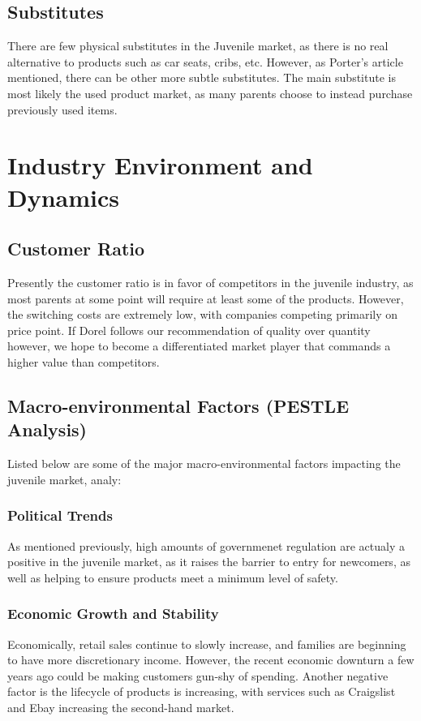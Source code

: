{\subsection{Substitutes}
There are few physical substitutes in the Juvenile market, as there is no real alternative to products such as car seats, cribs, etc.  However, as Porter's article mentioned, there can be other more subtle substitutes.  The main substitute is most likely the used product market, as many parents choose to instead purchase previously used items.

\section{Industry Environment and Dynamics}
\subsection{Customer Ratio}
Presently the customer ratio is in favor of competitors in the juvenile industry, as most parents at some point will require at least some of the products.  However, the switching costs are extremely low, with companies competing primarily on price point.  If Dorel follows our recommendation of quality over quantity however, we hope to become a differentiated market player that commands a higher value than competitors.
\subsection{Macro-environmental Factors (PESTLE Analysis)}
Listed below are some of the major macro-environmental factors impacting the juvenile market, analy:
\subsubsection{Political Trends}
As mentioned previously, high amounts of governmenet regulation are actualy a positive in the juvenile market, as it raises the barrier to entry for newcomers, as well as helping to ensure products meet a minimum level of safety.
\subsubsection{Economic Growth and Stability}
Economically, retail sales continue to slowly increase, and families are beginning to have more discretionary income.  However, the recent economic downturn a few years ago could be making customers gun-shy of spending.  Another negative factor is the lifecycle of products is increasing, with services such as Craigslist and Ebay increasing the second-hand market.
}
